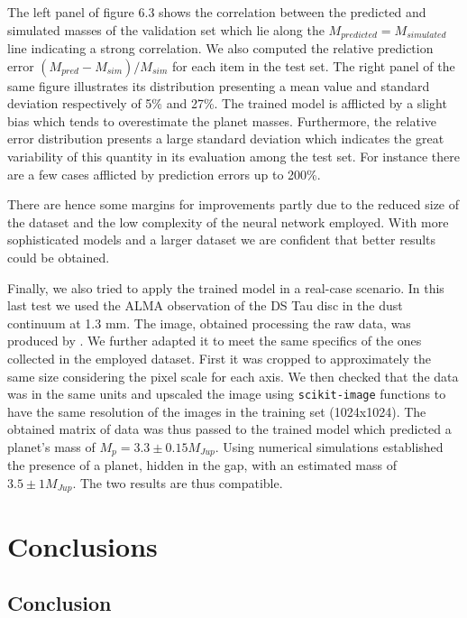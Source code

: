\documentclass[a4paper,10pt]{report}
\begin{document}
The left panel of figure 6.3 shows the correlation between the predicted and simulated masses of the validation set which
lie along the $M_{predicted} = M_{simulated}$ line indicating a strong correlation.
We also computed the relative prediction error $(M_{pred} - M_{sim})/M_{sim}$ for each item
in the test set. The right panel of the same figure illustrates its distribution
presenting a mean value and standard deviation respectively of 5\% and 27\%.
The trained model is afflicted by a slight bias which tends to overestimate the planet masses.
Furthermore, the relative error distribution presents a large standard deviation which indicates the great
variability of this quantity in its evaluation among the test set. For instance there are a few cases afflicted by
prediction errors up to 200\%.

There are hence some margins for improvements partly due to the reduced size of
the dataset and the low complexity of the neural network employed. With more sophisticated models and
a larger dataset we are confident that better results could be obtained.

Finally, we also tried to apply the trained model in a real-case scenario. In this last test we used
the ALMA observation of the DS Tau disc in the dust continuum at 1.3 mm.
The image, obtained processing the raw data, was produced by \citet{Long_2018}.
We further adapted it to meet the same specifics of the ones collected in the employed dataset.
First it was cropped to
approximately the same size considering the pixel scale for each axis.
We then checked that the data was in the same units and upscaled the image using
\lstinline{scikit-image} functions to have the same resolution of the images in the training set (1024x1024).
The obtained matrix of data was thus passed to the trained model which predicted a planet's mass of $M_p = 3.3 \pm 0.15 M_{Jup}$.
Using numerical simulations \citet{dstauv} established the presence of a planet, hidden in the gap, with an estimated
mass of $3.5 \pm 1 M_{Jup}$. The two results are thus compatible.

\chapter{Conclusions}
\section{Conclusion}
\end{document}

